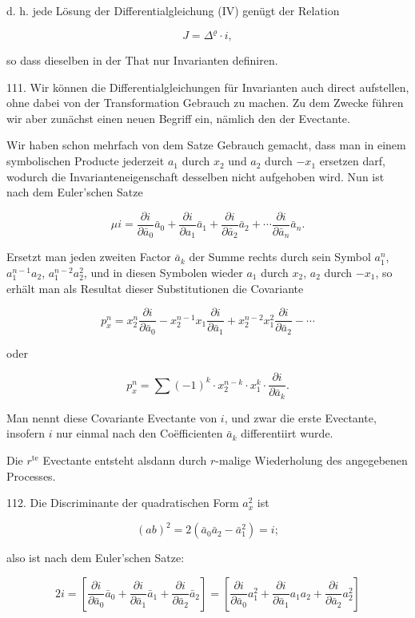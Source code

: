 d. h. jede Lösung der Differentialgleichung (IV) genügt der Relation

\[
J = \Delta^\varrho \cdot i,
\]

so dass dieselben in der That nur Invarianten definiren.

111.  Wir können die Differentialgleichungen für Invarianten auch direct aufstellen, ohne dabei von der Transformation Gebrauch zu machen. Zu dem Zwecke führen wir aber zunächst einen neuen Begriff ein, nämlich den der Evectante.

Wir haben schon mehrfach von dem Satze Gebrauch gemacht, dass man in einem symbolischen Producte jederzeit $a_1$ durch $x_2$ und $a_2$ durch $-x_1$ ersetzen darf, wodurch die Invarianteneigenschaft desselben nicht aufgehoben wird. Nun ist nach dem Euler'schen Satze

\[
\mu i = \frac{\partial i}{\partial \bar a_0}\bar a_0+\frac{\partial i}{\partial a_1}\bar a_1+\frac{\partial i}{\partial \bar a_2}\bar a_2+\cdots \frac{\partial i}{\partial \bar a_n}\bar a_n.
\]

Ersetzt man jeden zweiten Factor $\bar a_k$ der Summe rechts durch sein Symbol $a_1^n$, $a_1^{n-1}a_2$, $a_1^{n-2}a_2^2$, und in diesen Symbolen wieder $a_1$ durch $x_2$, $a_2$ durch $-x_1$, so erhält man als Resultat dieser Substitutionen die Covariante

\[
p_x^n = x_2^n\frac{\partial i}{\partial \bar a_0} - x_2^{n-1}x_1\frac{\partial i}{\partial \bar a_1} + x_2^{n-2}x_1^2\frac{\partial i}{\partial \bar a_2} - \cdots
\]

oder

\[
p_x^n = \sum(-1)^k\cdot x_2^{n-k}\cdot x_1^k\cdot\frac{\partial i}{\partial \bar a_k}.
\]

Man nennt diese Covariante Evectante von $i$, und zwar die erste Evectante, insofern $i$ nur einmal nach den Co\"efficienten $\bar a_k$ differentiirt wurde.

Die $r^{\text{te}}$ Evectante entsteht alsdann durch $r$-malige Wiederholung des angegebenen Processes.

112.  Die Discriminante der quadratischen Form $a_x^2$ ist

\[
(ab)^2 = 2(\bar a_0\bar a_2-\bar a_1^2)=i;
\]

also ist nach dem Euler'schen Satze:

\[
2i=\left[\frac{\partial i}{\partial \bar a_0}\bar a_0+\frac{\partial i}{\partial \bar a_1}\bar a_1+\frac{\partial i}{\partial \bar a_2}\bar a_2\right]=\left[\frac{\partial i}{\partial \bar a_0}a_1^2+\frac{\partial i}{\partial \bar a_1}a_1a_2+\frac{\partial i}{\partial \bar a_2}a_2^2\right]
\]

